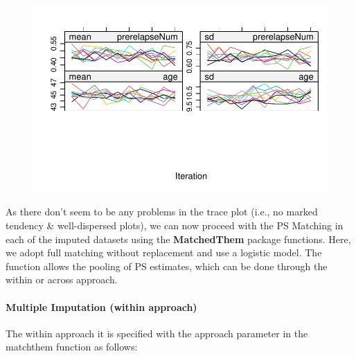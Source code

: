 \documentclass[
  letterpaper,
  DIV=11,
  numbers=noendperiod]{scrreprt}
\let\oldparagraph\paragraph
\renewcommand{\paragraph}[1]{\oldparagraph{#1}\mbox{}}
\begin{document}
\begin{figure}[H]

{\centering \includegraphics{chapter_09_files/figure-pdf/homimp convergency-2.pdf}

}

\end{figure}

As there don't seem to be any problems in the trace plot (i.e., no
marked tendency \& well-dispersed plots), we can now proceed with the PS
Matching in each of the imputed datasets using the \textbf{MatchedThem}
package functions. Here, we adopt full matching without replacement and
use a logistic model. The function allows the pooling of PS estimates,
which can be done through the within or across approach.

\hypertarget{multiple-imputation-within-approach}{%
\paragraph{Multiple Imputation (within
approach)}\label{multiple-imputation-within-approach}}

The within approach it is specified with the approach parameter in the
matchthem function as follows:
\end{document}
